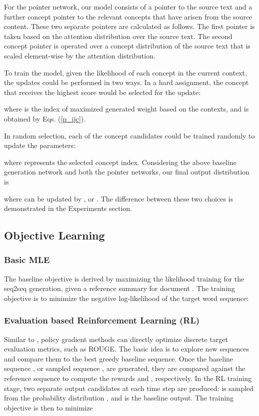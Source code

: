 \documentclass[11pt,a4paper]{article}
\begin{document}
For the pointer network, our model consists of a pointer to the source text and a further concept pointer to the relevant concepts that have arisen from the source content. These two separate pointers are calculated as follows. The first pointer is taken based on the attention distribution  over the source text. The second concept pointer is operated over a concept distribution of the source text that is scaled element-wise by the attention distribution. 

To train the model, 
given the likelihood of each concept in the current context, the updates could be performed in two ways. In a hard assignment, the concept that receives the highest score would be selected for the update:

where  is the index of maximized generated weight based on the  contexts, and  is obtained by Eqs. (\ref{p_ijc}).

In random selection, each of the concept candidates could be trained randomly to update the parameters: 


where  represents the selected concept index. Considering the above baseline generation network and both the  pointer networks, our final  output distribution is 

where  can be updated by , or . The difference between these two choices is demonstrated  in the  Experiments section. 

\subsection{Objective Learning}
\subsubsection{Basic MLE}
The baseline objective is derived by maximizing the likelihood training for the seq2seq generation, given a reference summary  for document . The training objective is to 
minimize the negative log-likelihood of the target word
sequence:


\subsubsection{Evaluation based Reinforcement Learning (RL)}
Similar to \citet{paulus2017deep}, policy gradient methods can directly optimize discrete target evaluation metrics, such as ROUGE. 
The basic idea is to explore new sequences and compare them to the
best greedy baseline sequence. Once the baseline sequence ,  or sampled sequence , are  generated, they are compared against the reference sequence  to compute the rewards  and , respectively. In the RL training stage, two separate output candidates at each time step are produced:   is sampled from the probability distribution  , and  is the baseline output. 
The training objective is then to minimize
\end{document}
